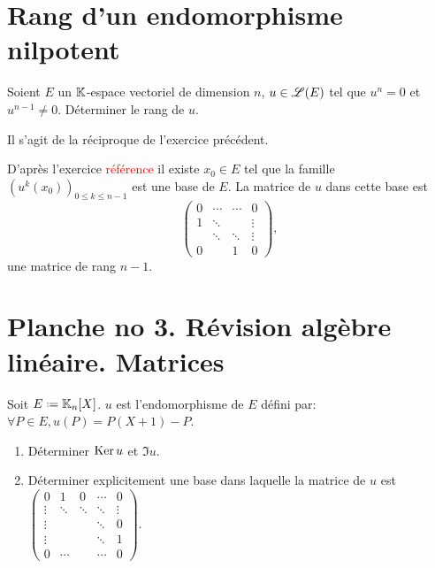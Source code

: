 \section{Rang d'un endomorphisme nilpotent} 
\begin{exercice}
    Soient $E$ un $\mathbb{K}$-espace vectoriel de dimension $n$, $u \in \mathscr{L}(E)$ tel que $u^n = 0$ et $u^{n-1} \not= 0$. Déterminer le rang de $u$.
\end{exercice}

Il s'agit de la réciproque de l'exercice précédent.

\begin{solution}
    D'après l'exercice \textcolor{red}{référence} il existe $x_0 \in E$ tel que la famille $\left( u^k(x_0)\right)_{0 \leqslant k \leqslant n-1}$ est une base de $E$. La matrice de $u$ dans cette base est 
    $$
    \begin{pmatrix}
        0 & \cdots & \cdots & 0 \\
        1 & \ddots & & \vdots \\
        & \ddots & \ddots & \vdots \\
        0 & & 1 & 0
    \end{pmatrix},
    $$
    une matrice de rang $n-1$.
\end{solution}

\section{\cite{maths-france} Planche no 3. Révision algèbre linéaire. Matrices}

\begin{exercice}
    Soit $E \defeq \K_n[X]$. $u$ est l'endomorphisme de $E$ défini par: $\forall P \in E, u(P) = P(X+1) - P$.
    \begin{enumerate}
        \item Déterminer $\mathrm{Ker}\, u$ et $\Im u$.
        \item Déterminer explicitement une base dans laquelle la matrice de $u$ est 
        $
        \begin{pmatrix}
            0 & 1 & 0 & \cdots & 0 \\
            \vdots & \ddots & \ddots & \ddots & \vdots \\
            \vdots & & & \ddots & 0 \\
            \vdots & & & \ddots & 1 \\
            0 & \cdots & & \cdots & 0
        \end{pmatrix}
        $.
    \end{enumerate}
\end{exercice}

